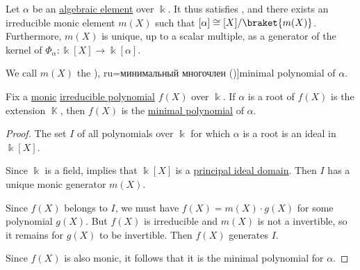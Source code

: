 \begin{definition}\label{def:algebraic_element_minimal_polynomial}
  Let \( \alpha \) be an \hyperref[def:algebraic_element]{algebraic element} over \( \Bbbk \). It thus satisfies , and there exists an irreducible monic element \( m(X) \) such that \( \Bbbk[\alpha] \cong \Bbbk[X] / \braket{ m(X) } \). Furthermore, \( m(X) \) is unique, up to a scalar multiple, as a generator of the kernel of \( \Phi_\alpha: \Bbbk[X] \to \Bbbk[\alpha] \).

  We call \( m(X) \) the \term[bg=минимален полином (\cite[def. VI.2]{ГеновМиховскиМоллов1991Алгебра}), ru=минимальный многочлен (\cite[410]{Винберг2014КурсАлгебры})]{minimal polynomial} of \( \alpha \).
\end{definition}

\begin{proposition}\label{thm:irreducible_polynomial_is_minimal}
  Fix a \hyperref[def:monic_polynomial]{monic} \hyperref[def:domain_divisibility/irreducible]{irreducible polynomial} \( f(X) \) over \( \Bbbk \). If \( \alpha \) is a root of \( f(X) \) is the extension \( \BbbK \), then \( f(X) \) is the \hyperref[def:algebraic_element_minimal_polynomial]{minimal polynomial} of \( \alpha \).
\end{proposition}
\begin{proof}
  The set \( I \) of all polynomials over \( \Bbbk \) for which \( \alpha \) is a root is an ideal in \( \Bbbk[X] \).

  Since \( \Bbbk \) is a field,  implies that \( \Bbbk[X] \) is a \hyperref[def:principal_ideal_domain]{principal ideal domain}. Then \( I \) has a unique monic generator \( m(X) \).

  Since \( f(X) \) belongs to \( I \), we must have \( f(X) = m(X) \cdot g(X) \) for some polynomial \( g(X) \). But \( f(X) \) is irreducible and \( m(X) \) is not a invertible, so it remains for \( g(X) \) to be invertible. Then \( f(X) \) generates \( I \).

  Since \( f(X) \) is also monic, it follows that it is the minimal polynomial for \( \alpha \).
\end{proof}

